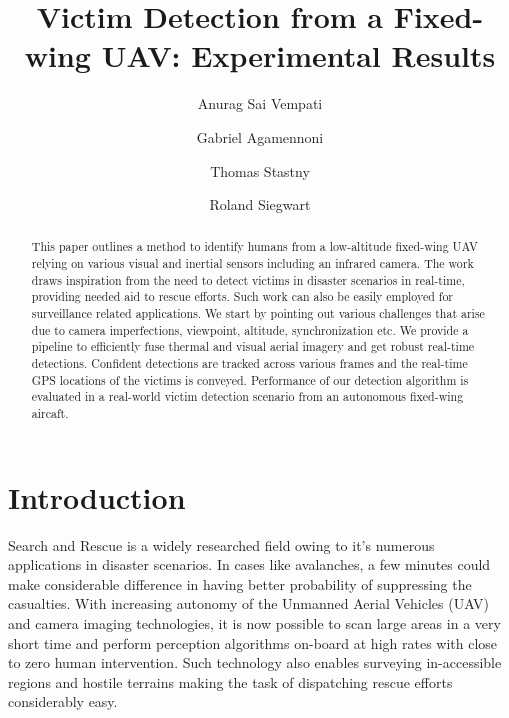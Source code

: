 \documentclass[runningheads]{llncs}
\begin{document}
\lstset{language=C++}  

\pagestyle{headings}

\mainmatter

\title{Victim Detection from a Fixed-wing UAV: Experimental Results}

\author{Anurag Sai Vempati \and Gabriel Agamennoni \and
Thomas Stastny \and Roland Siegwart}





\maketitle

\begin{abstract}
This paper outlines a method to identify humans from a low-altitude fixed-wing UAV relying on various visual and inertial sensors including an infrared camera. The work draws inspiration from the need to detect victims in disaster scenarios in real-time, providing needed aid to rescue efforts. Such work can also be easily employed for surveillance related applications. We start by pointing out various challenges that arise due to camera imperfections, viewpoint, altitude, synchronization etc. We provide a pipeline to efficiently fuse thermal and visual aerial imagery and get robust real-time detections. Confident detections are tracked across various frames and the real-time GPS locations of the victims is conveyed. Performance of our detection algorithm is evaluated in a real-world victim detection scenario from an autonomous fixed-wing aircaft.
\end{abstract}


\section{Introduction}
Search and Rescue is a widely researched field owing to it's numerous applications in disaster scenarios. In cases like avalanches, a few minutes could make considerable difference in having better probability of suppressing the casualties. With increasing autonomy of the Unmanned Aerial Vehicles (UAV) and camera imaging technologies, it is now possible to scan large areas in a very short time and perform perception algorithms on-board at high rates with close to zero human intervention. Such technology also enables surveying in-accessible regions and hostile terrains making the task of dispatching rescue efforts considerably easy.
\end{document}
